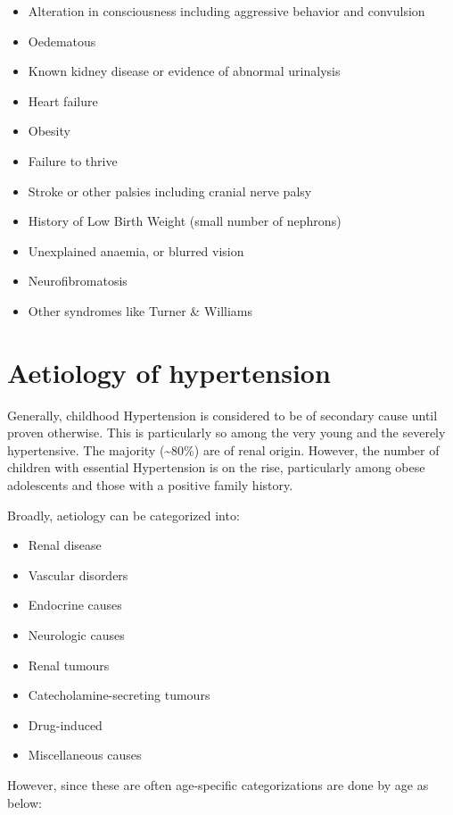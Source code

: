 \documentclass[
  letterpaper,
  DIV=11,
  numbers=noendperiod]{scrreprt}
\providecommand{\tightlist}{%
  \setlength{\itemsep}{0pt}\setlength{\parskip}{0pt}}\usepackage{longtable,booktabs,array}
\begin{document}
\begin{itemize}
\tightlist
\item
  Alteration in consciousness including aggressive behavior and
  convulsion
\item
  Oedematous
\item
  Known kidney disease or evidence of abnormal urinalysis
\item
  Heart failure
\item
  Obesity
\item
  Failure to thrive
\item
  Stroke or other palsies including cranial nerve palsy
\item
  History of Low Birth Weight (small number of nephrons)
\item
  Unexplained anaemia, or blurred vision
\item
  Neurofibromatosis
\item
  Other syndromes like Turner \& Williams
\end{itemize}

\hypertarget{aetiology-of-hypertension}{%
\section{Aetiology of hypertension}\label{aetiology-of-hypertension}}

Generally, childhood Hypertension is considered to be of secondary cause
until proven otherwise. This is particularly so among the very young and
the severely hypertensive. The majority (\textasciitilde80\%) are of
renal origin. However, the number of children with essential
Hypertension is on the rise, particularly among obese adolescents and
those with a positive family history.

Broadly, aetiology can be categorized into:

\begin{itemize}
\tightlist
\item
  Renal disease
\item
  Vascular disorders
\item
  Endocrine causes
\item
  Neurologic causes
\item
  Renal tumours
\item
  Catecholamine-secreting tumours
\item
  Drug-induced
\item
  Miscellaneous causes
\end{itemize}

However, since these are often age-specific categorizations are done by
age as below:
\end{document}
